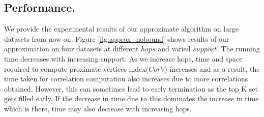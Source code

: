 

\subsection{Performance.}
We provide the experimental results of our approximate algorithm on large datasets from now on. 
\newline
\newline
{} Figure \ref{fig:approx_nobound} shows results of our approximation on four datasets at different $hops$ and varied $support$. The running time decreases with increasing support. As we increase hops, time and space required to compute proximate vertices index($CorV$) increases and as a result, the time taken for correlation computation also increases due to more correlations obtained. However, this can  sometimes lead to early termination as the top K set gets filled early. If the decrease in time due to this dominates the increase in time which is there, time may also decrease with increasing hops.

